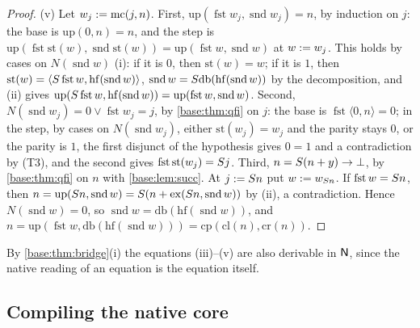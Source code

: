 \begin{proof}
(v) Let $w_j\mathrel{:=}\mathrm{mc}(j,n)$.  First,
$\mathrm{up}(\operatorname{fst}w_j,\operatorname{snd}w_j)=n$, by induction
on $j$: the base is $\mathrm{up}(0,n)=n$, and the step is
$\mathrm{up}(\operatorname{fst}\mathrm{st}(w),\operatorname{snd}\mathrm{st}(w))
=\mathrm{up}(\operatorname{fst}w,\operatorname{snd}w)$ at $w\mathrel{:=} w_j$.  This
holds by cases on $N(\operatorname{snd}w)$ (i): if it is $0$, then
$\mathrm{st}(w)=w$; if it is $1$, then
$\mathrm{st}(w)=\langle S\operatorname{fst}w,\mathrm{hf}(\operatorname{snd}w)\rangle$,
$\operatorname{snd}w=S\mathrm{db}(\mathrm{hf}(\operatorname{snd}w))$ by the
decomposition, and (ii) gives
$\mathrm{up}(S\operatorname{fst}w,\mathrm{hf}(\operatorname{snd}w))
=\mathrm{up}(\operatorname{fst}w,\operatorname{snd}w)$.
Second, $N(\operatorname{snd}w_j)=0\vee\operatorname{fst}w_j=j$, by
\cref{base:thm:qfi} on $j$: the base is $\operatorname{fst}\langle 0,n\rangle=0$;
in the step, by cases on $N(\operatorname{snd}w_j)$, either
$\mathrm{st}(w_j)=w_j$ and the parity stays $0$, or the parity is $1$, the
first disjunct of the hypothesis gives $0=1$ and a contradiction by (T3),
and the second gives $\operatorname{fst}\mathrm{st}(w_j)=S j$.
Third, $n=S(n+y)\to\bot$, by \cref{base:thm:qfi} on $n$ with
\cref{base:lem:succ}.  At $j\mathrel{:=}S n$ put $w\mathrel{:=} w_{S n}$.  If
$\operatorname{fst}w=S n$, then
$n=\mathrm{up}(S n,\operatorname{snd}w)=S(n+\mathrm{ex}(S n,\operatorname{snd}w))$
by (ii), a contradiction.  Hence $N(\operatorname{snd}w)=0$, so
$\operatorname{snd}w=\mathrm{db}(\mathrm{hf}(\operatorname{snd}w))$, and
$n=\mathrm{up}(\operatorname{fst}w,\mathrm{db}(\mathrm{hf}(\operatorname{snd}w)))
=\mathrm{cp}(\mathrm{cl}(n),\mathrm{cr}(n))$.
\end{proof}

By \cref{base:thm:bridge}(i) the equations (iii)--(v) are also derivable in
$\mathsf{N}$, since the native reading of an equation is the equation itself.

\subsection{Compiling the native core}
\label{base:sec:pfcompile}

